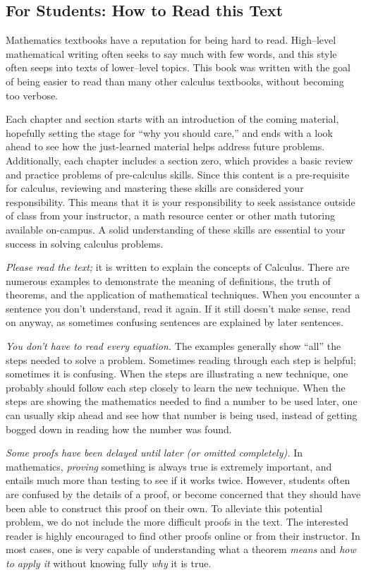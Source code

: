 \subsection*{For Students: How to Read this Text}

Mathematics textbooks have a reputation for being hard to read. High--level mathematical writing often seeks to say much with few words, and this style often seeps into texts of lower--level topics. This book was written with the goal of being easier to read than many other calculus textbooks, without becoming too verbose. 

Each chapter and section starts with an introduction of the coming material, hopefully setting the stage for “why you should care,” and ends with a look ahead to see how the just-learned material helps address future problems. Additionally, each chapter includes a section zero, which provides a basic review and practice problems of pre-calculus skills. Since this content is a pre-requisite for calculus, reviewing and mastering these skills are considered your responsibility. This means that it is your responsibility to seek assistance outside of class from your instructor, a math resource center or other math tutoring available on-campus.  A solid understanding of these skills are essential to your success in solving calculus problems.

\textit{Please read the text;} it is written to explain the concepts of Calculus. There are numerous examples to demonstrate the meaning of definitions, the truth of theorems, and the application of mathematical techniques. When you encounter a sentence you don't understand, read it again. If it still doesn't make sense, read on anyway, as sometimes confusing sentences are explained by later sentences.

\textit{You don't have to read every equation.} The examples generally show ``all'' the steps needed to solve a problem. Sometimes reading through each step is helpful; sometimes it is confusing. When the steps are illustrating a new technique, one probably should follow each step closely to learn the new technique. When the steps are showing the mathematics needed to find a number to be used later, one can usually skip ahead and see how that number is being used, instead of getting bogged down in reading how the number was found.

\textit{Some proofs have been delayed until later (or omitted completely).} In mathematics, \textit{proving} something is always true is extremely important, and entails much more than testing to see if it works twice. However, students often are confused by the details of a proof, or become concerned that they should have been able to construct this proof on their own. To alleviate this potential problem, we do not include the more difficult proofs in the text.
The interested reader is highly encouraged to find other proofs online or from their instructor. In most cases, one is very capable of understanding what a theorem \textit{means} and \textit{how to apply it} without knowing fully \textit{why} it is true.

